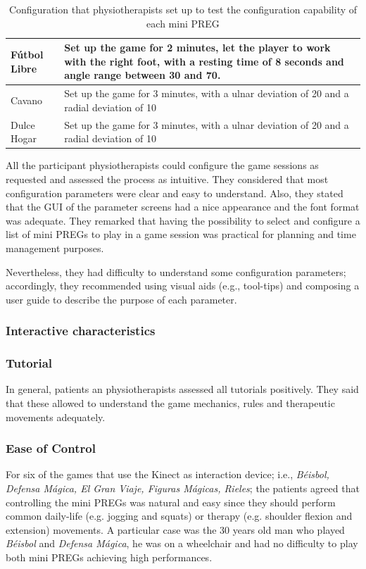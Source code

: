 \begin{table}[tbh]
{\begin{tabular}{lp{16cm}}
\\\midrule
F\'utbol Libre
& Set up the game for 2 minutes, let the player to work with the right foot, with a resting time of 8 seconds and angle range between 30 and 70.
\\\midrule
Cavano
& Set up the game for 3 minutes, with a ulnar deviation of 20 and a radial deviation of 10
\\\midrule
Dulce Hogar
& Set up the game for 3 minutes, with a ulnar deviation of 20 and a radial deviation of 10
\\\midrule
\bottomrule
\end{tabular}}
\caption{Configuration that physiotherapists set up to test the configuration capability of each mini \ac{PREG}}
\label{tab:configurations}
\end{table}

All the participant physiotherapists could configure the game sessions as requested and assessed the process as intuitive. They considered that most configuration parameters were clear and easy to understand. Also, they stated that the \ac{GUI} of the parameter screens had a nice appearance and the font format was adequate. They remarked that having the possibility to select and configure a list of mini \acp{PREG} to play in a game session was practical for planning and time management purposes.

Nevertheless, they had difficulty to understand some configuration parameters; accordingly, they recommended using visual aids (e.g., tool-tips) and composing a user guide to describe the purpose of each parameter.

\subsubsection{Interactive characteristics}
\subsubsection*{Tutorial}
In general, patients an physiotherapists assessed all tutorials positively. They said that these allowed to understand the game mechanics, rules and therapeutic movements adequately.

\subsubsection*{Ease of Control}
For six of the games that use the Kinect as interaction device; i.e., \textit{B\'eisbol, Defensa M\'agica, El Gran Viaje, Figuras Mágicas, Rieles}; the patients agreed that controlling the mini \acp{PREG} was natural and easy since they should perform common daily-life (e.g. jogging and squats) or therapy (e.g. shoulder flexion and extension) movements. A particular case was the 30 years old man who played \textit{B\'eisbol} and \textit{Defensa M\'agica}, he was on a wheelchair and had no difficulty to play both mini \acp{PREG} achieving high performances.


